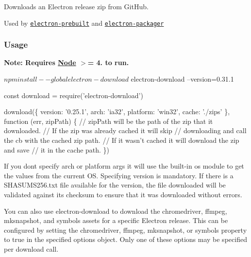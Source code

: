 \href{https://travis-ci.org/electron-userland/electron-download}{\tt } \href{https://ci.appveyor.com/project/electron-bot/electron-download/branch/master}{\tt }

\href{https://www.npmjs.com/package/electron-download}{\tt }

Downloads an Electron release zip from Git\+Hub.

Used by \href{https://npmjs.org/electron-prebuilt}{\tt electron-\/prebuilt} and \href{https://npmjs.org/electron-packager}{\tt electron-\/packager}

\subsubsection*{Usage}

{\bfseries Note\+: Requires \mbox{\hyperlink{classNode}{Node}} $>$= 4. to run.}


\begin{DoxyCode}
$ npm install --global electron-download
$ electron-download --version=0.31.1
\end{DoxyCode}



\begin{DoxyCode}
const download = require('electron-download')

download(\{
  version: '0.25.1',
  arch: 'ia32',
  platform: 'win32',
  cache: './zips'
\}, function (err, zipPath) \{
  // zipPath will be the path of the zip that it downloaded.
  // If the zip was already cached it will skip
  // downloading and call the cb with the cached zip path.
  // If it wasn't cached it will download the zip and save
  // it in the cache path.
\})
\end{DoxyCode}


If you don\textquotesingle{}t specify {\ttfamily arch} or {\ttfamily platform} args it will use the built-\/in {\ttfamily os} module to get the values from the current OS. Specifying {\ttfamily version} is mandatory. If there is a {\ttfamily S\+H\+A\+S\+U\+M\+S256.\+txt} file available for the {\ttfamily version}, the file downloaded will be validated against its checksum to ensure that it was downloaded without errors.

You can also use {\ttfamily electron-\/download} to download the {\ttfamily chromedriver}, {\ttfamily ffmpeg}, {\ttfamily mksnapshot}, and symbols assets for a specific Electron release. This can be configured by setting the {\ttfamily chromedriver}, {\ttfamily ffmpeg}, {\ttfamily mksnapshot}, or {\ttfamily symbols} property to {\ttfamily true} in the specified options object. Only one of these options may be specified per download call.

